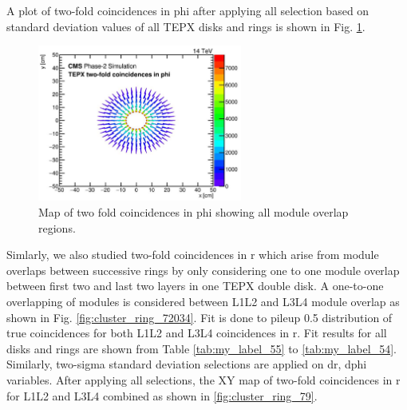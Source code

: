 \newpage
A plot of two-fold coincidences in phi after applying all selection based on standard deviation values of all TEPX disks and rings is shown in Fig. \ref{fig:cluster_ring_720}.

\begin{figure}[!htp]
\centering
\includegraphics[width=0.6\textwidth]{ashish_thesis/twofoldinphi_sch.png}
\caption[Map Of Two Fold Coincidences in phi]{%
  Map of two fold coincidences in phi showing all module overlap regions.
}
\label{fig:cluster_ring_720}
\end{figure}

Simlarly, we also studied two-fold coincidences in r which arise from module overlaps between successive rings by only considering one to one module overlap between first two and last two layers in one TEPX double disk.  %
 A one-to-one overlapping of modules is considered between L1L2 and L3L4 module overlap as shown in Fig. \ref{fig:cluster_ring_72034}. %
 Fit is done to pileup 0.5 distribution of true coincidences for both L1L2 and L3L4 coincidences in r. %
  Fit results for all disks and rings are shown from  Table \ref{tab:my_label_55} to \ref{tab:my_label_54}. Similarly, two-sigma standard deviation selections are applied on dr, dphi variables. After applying all selections, the XY map of two-fold coincidences in r for L1L2 and L3L4 combined as shown in \ref{fig:cluster_ring_79}.

